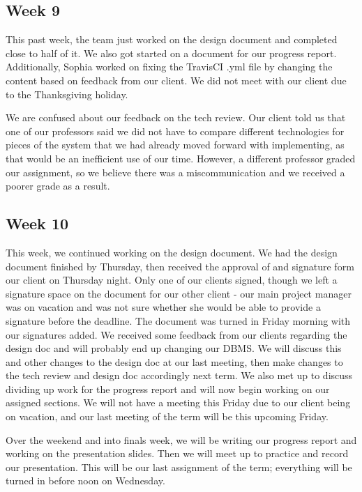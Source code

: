 \documentclass[onecolumn, draftclsnofoot,10pt, compsoc]{IEEEtran}
\begin{document}
\begin{flushleft}
\subsection{Week 9}
This past week, the team just worked on the design document and completed close to half of it. We also got started on a document for our progress report. Additionally, Sophia worked on fixing the TravisCI .yml file by changing the content based on feedback from our client. We did not meet with our client due to the Thanksgiving holiday.

\medskip

We are confused about our feedback on the tech review. Our client told us that one of our professors said we did not have to compare different technologies for pieces of the system that we had already moved forward with implementing, as that would be an inefficient use of our time. However, a different professor graded our assignment, so we believe there was a miscommunication and we received a poorer grade as a result.

\subsection{Week 10}

This week, we continued working on the design document. We had the design document finished by Thursday, then received the approval of and signature form our client on Thursday night. Only one of our clients signed, though we left a signature space on the document for our other client - our main project manager was on vacation and was not sure whether she would be able to provide a signature before the deadline. The document was turned in Friday morning with our signatures added. We received some feedback from our clients regarding the design doc and will probably end up changing our DBMS. We will discuss this and other changes to the design doc at our last meeting, then make changes to the tech review and design doc accordingly next term. We also met up to discuss dividing up work for the progress report and will now begin working on our assigned sections. We will not have a meeting this Friday due to our client being on vacation, and our last meeting of the term will be this upcoming Friday.

\medskip

Over the weekend and into finals week, we will be writing our progress report and working on the presentation slides. Then we will meet up to practice and record our presentation. This will be our last assignment of the term; everything will be turned in before noon on Wednesday.


\end{flushleft}
\end{document}
